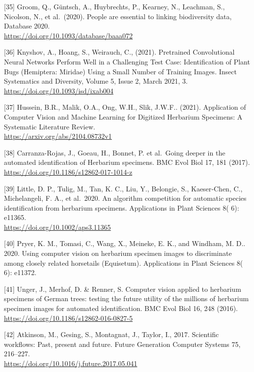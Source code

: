 {[}35{]} Groom, Q., Güntsch, A., Huybrechts, P., Kearney, N., Leachman,
S., Nicolson, N., et al.~(2020). People are essential to linking
biodiversity data, Database 2020.\\
\url{https://doi.org/10.1093/database/baaa072}

{[}36{]} Knyshov, A., Hoang, S., Weirauch, C., (2021). Pretrained
Convolutional Neural Networks Perform Well in a Challenging Test Case:
Identification of Plant Bugs (Hemiptera: Miridae) Using a Small Number
of Training Images. Insect Systematics and Diversity, Volume 5, Issue 2,
March 2021, 3.\\
\url{https://doi.org/10.1093/isd/ixab004}

{[}37{]} Hussein, B.R., Malik, O.A., Ong, W.H., Slik, J.W.F.. (2021).
Application of Computer Vision and Machine Learning for Digitized
Herbarium Specimens: A Systematic Literature Review.\\
\url{https://arxiv.org/abs/2104.08732v1}

{[}38{]} Carranza-Rojas, J., Goeau, H., Bonnet, P. et al.~Going deeper
in the automated identification of Herbarium specimens. BMC Evol Biol
17, 181 (2017).\\
\url{https://doi.org/10.1186/s12862-017-1014-z}

{[}39{]} Little, D. P., Tulig, M., Tan, K. C., Liu, Y., Belongie, S.,
Kaeser‐Chen, C., Michelangeli, F. A., et al.~2020. An algorithm
competition for automatic species identification from herbarium
specimens. Applications in Plant Sciences 8( 6): e11365.\\
\url{https://doi.org/10.1002/aps3.11365}

{[}40{]} Pryer, K. M., Tomasi, C., Wang, X., Meineke, E. K., and
Windham, M. D.. 2020. Using computer vision on herbarium specimen images
to discriminate among closely related horsetails (Equisetum).
Applications in Plant Sciences 8( 6): e11372.

{[}41{]} Unger, J., Merhof, D. \& Renner, S. Computer vision applied to
herbarium specimens of German trees: testing the future utility of the
millions of herbarium specimen images for automated identification. BMC
Evol Biol 16, 248 (2016).\\
\url{https://doi.org/10.1186/s12862-016-0827-5}

{[}42{]} Atkinson, M., Gesing, S., Montagnat, J., Taylor, I., 2017.
Scientific workflows: Past, present and future. Future Generation
Computer Systems 75, 216--227.\\
\url{https://doi.org/10.1016/j.future.2017.05.041}

